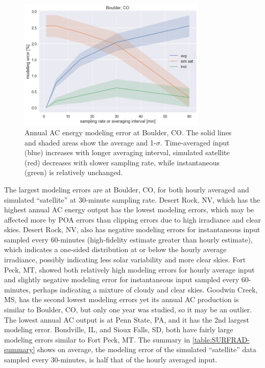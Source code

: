 \documentclass[conference]{IEEEtran}
\begin{document}
\begin{figure}[htbp]
\centerline{\includegraphics[width=9cm]{analysis/tbl_all.png}}
\caption{Annual AC energy modeling error at Boulder, CO. The solid lines and shaded areas show the average and 1-$\sigma$. Time-averaged input (blue) increases with longer averaging interval, simulated satellite (red) decreases with slower sampling rate, while instantaneous (green) is relatively unchanged.}
\label{fig:tbl2010}
\end{figure}

The largest modeling errors are at Boulder, CO, for both hourly averaged and simulated ``satellite'' at 30-minute sampling rate. Desert Rock, NV, which has the highest annual AC energy output has the lowest modeling errors, which may be affected more by POA errors than clipping errors due to high irradiance and clear skies. Desert Rock, NV, also has negative modeling errors for instantaneous input sampled every 60-minutes (high-fidelity estimate greater than hourly estimate), which indicates a one-sided distribution at or below the hourly average irradiance, possibly indicating less solar variability and more clear skies. Fort Peck, MT, showed both relatively high modeling errors for hourly average input and slightly negative modeling error for instantaneous input sampled every 60-minutes, perhaps indicating a mixture of cloudy and clear skies. Goodwin Creek, MS, has the second lowest modeling errors yet its annual AC production is similar to Boulder, CO, but only one year was studied, so it may be an outlier. The lowest annual AC output is at Penn State, PA, and it has the 2nd largest modeling error. Bondville, IL, and Sioux Falls, SD, both have fairly large modeling errors similar to Fort Peck, MT. The summary in \ref{table:SURFRAD-summary} shows on average, the modeling error of the simulated ``satellite'' data sampled every 30-minutes, is half that of the hourly averaged input.
\end{document}
